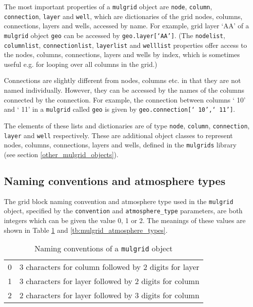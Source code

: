 The most important properties of a \texttt{mulgrid} object are \texttt{node}, \texttt{column}, \texttt{connection}, \texttt{layer} and \texttt{well}, which are dictionaries of the grid nodes, columns, connections, layers and wells, accessed by name.  For example, grid layer `AA' of a \texttt{mulgrid} object \texttt{geo} can be accessed by \texttt{geo.layer[`AA']}.  (The \texttt{nodelist}, \texttt{columnlist}, \texttt{connectionlist}, \texttt{layerlist} and \texttt{welllist} properties offer access to the nodes, columns, connections, layers and wells by index, which is sometimes useful e.g. for looping over all columns in the grid.)

Connections are slightly different from nodes, columns etc. in that they are not named individually.  However, they can be accessed by the names of the columns connected by the connection.  For example, the connection between columns ` 10' and ` 11' in a \texttt{mulgrid} called \texttt{geo} is given by \texttt{geo.connection[` 10',` 11']}.

The elements of these lists and dictionaries are of type \texttt{node}, \texttt{column}, \texttt{connection}, \texttt{layer} and \texttt{well} respectively.  These are additional object classes to represent nodes, columns, connections, layers and wells, defined in the \texttt{mulgrids} library (see section \ref{other_mulgrid_objects}).

\subsection{Naming conventions and atmosphere types}

The grid block naming convention and atmosphere type used in the \texttt{mulgrid} object, specified by the \texttt{convention} and \texttt{atmosphere\_type} parameters, are both integers which can be given the value 0, 1 or 2.  The meanings of these values are shown in Table \ref{tb:mulgrid_conventions} and \ref{tb:mulgrid_atmosphere_types}.

\begin{table}
  \begin{center}
    \begin{tabular}{|l|l|}
      \hline
      0 & 3 characters for column followed by 2 digits for layer \\
      1 & 3 characters for layer followed by 2 digits for column \\
      2 & 2 characters for layer followed by 3 digits for column \\
      \hline
    \end{tabular}
    \caption{Naming conventions of a \texttt{mulgrid} object}
    \label{tb:mulgrid_conventions}
  \end{center}
\end{table}

